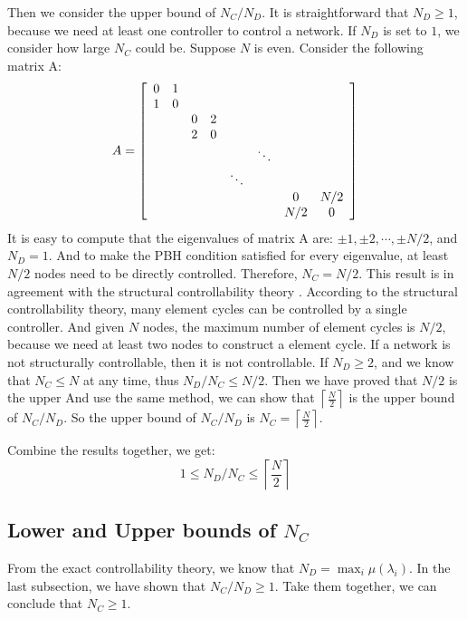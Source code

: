 \documentclass[10pt, conference, letterpaper]{IEEEtran}
\begin{document}
Then we consider the upper bound of $N_C/N_D$. It is straightforward that $N_D \ge 1$, because we need at least one controller to control a network. If $N_D$ is set to $1$, we consider how large $N_C$ could be.
Suppose $N$ is even. Consider the following matrix A:
\begin{equation*}
A = {\left[ \begin{array}{c c c c c c c c}
0 & 1 &  &  &  & & & \\
1 & 0 &  &  &  & & & \\
 &  &  0 & 2 &  & & & \\
 &  &  2 & 0 &  & & & \\
 &   &  &  &  & \ddots & & \\
 &  &  &  & \ddots & & & \\
  &  &  &  &  & &0 & N/2 \\
 &  &  &  &  & & N/2 & 0
\end{array}
\right ]}
\end{equation*}
It is easy to compute that the eigenvalues of matrix A are: $\pm 1,\pm 2, \cdots, \pm N/2$, and $N_D = 1$. And to make the PBH condition satisfied for every eigenvalue, at least $N/2$ nodes need to be directly controlled. Therefore, $N_C = N/2$. This result is in agreement with the structural controllability theory \cite{liu2011controllability}. According to the structural controllability theory, many element cycles can be controlled by a single controller. And given $N$ nodes, the maximum number of element cycles is $N/2$, because we need at least two nodes to construct a element cycle. If a network is not structurally controllable, then it is not controllable. If $N_D \ge 2$, and we know that $N_C \le N$ at any time, thus $N_D/N_C \le N/2$. Then we have proved that $N/2$ is the upper  And use the same method, we can show that $\left \lceil \frac{N}{2} \right \rceil$ is the upper bound of $N_C/N_D$. So the upper bound of $N_C/N_D$ is $N_C = \left \lceil \frac{N}{2} \right \rceil$.

Combine the results together, we get:
\begin{equation*}
1 \le N_D / N_C \le \left \lceil \frac{N}{2} \right \rceil
\end{equation*}

\subsection{Lower and Upper bounds of $N_C$}
From the exact controllability theory, we know that $N_D = \max_i {\mu(\lambda_i)}$. In the last subsection, we have shown that $N_C/N_D \ge 1$. Take them together, we can conclude that $N_C \ge 1$.
\end{document}
